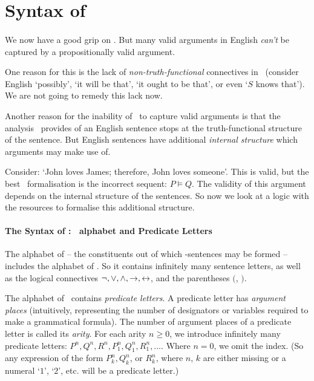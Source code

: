 




\section{Syntax of \ltwo}\label{ltwo}
\paragraph{\ltwo}

We now have a good grip on \lone. But many valid arguments in English \emph{can't} be captured by a propositionally valid argument. 

 One reason for this is the lack of \emph{non-truth-functional} connectives in \lone\ (consider English `possibly', `it will be that', `it ought to be that', or even `$S$ knows that'). We are not going to remedy this lack now. 

Another reason for the inability of \lone\ to capture valid arguments is that the analysis \lone\ provides of an English sentence stops at the truth-functional structure of the sentence. But English sentences have additional \emph{internal structure} which arguments may make use of.

Consider: `John loves James; therefore, John loves someone'. This is valid, but the best \lone\ formalisation is the incorrect sequent: $P\vDash Q$. The validity of this argument depends on the internal structure of the sentences. So now we look at a logic with the resources to formalise this additional structure.

\paragraph{The Syntax of \ltwo: \lone\ alphabet and Predicate Letters}

The alphabet of \ltwo – the constituents out of which \ltwo-sentences may be formed – includes the alphabet of \lone. So it contains infinitely many sentence letters, as well as the logical connectives $\neg,\vee,\wedge,\to,
\leftrightarrow$, and the parentheses $($, $)$.

The alphabet of \ltwo\ contains  \emph{predicate letters}. A predicate letter has \emph{argument places} (intuitively, representing the number of designators or variables required to make a grammatical formula). The number of argument places of a predicate letter is called its \emph{arity}. For each arity $n \geqslant 0$, we introduce infinitely many predicate letters: $P^{n},Q^{n},R^{n},P^{n}_{1},Q^{n}_{1},R^{n}_{1},\ldots$. Where $n=0$, we omit the index. (So any expression of the form $P^{n}_{k}, Q^{n}_{k}$, or $R^{n}_{k}$, where $n$, $k$ are either missing or a numeral `$1$', `$2$', etc. will be a predicate letter.)

